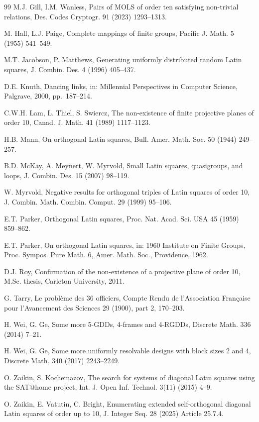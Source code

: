 \documentclass[11pt]{article}
\theoremstyle{remark}
\begin{document}
\begin{thebibliography}{99}
 M.J. Gill, I.M. Wanless, Pairs of MOLS of order ten satisfying non-trivial
relations, Des. Codes Cryptogr. 91 (2023) 1293--1313.

 M. Hall, L.J. Paige, Complete mappings of finite groups, Pacific J. Math. 5
(1955) 541--549.

 M.T. Jacobson, P. Matthews, Generating uniformly distributed random Latin
squares, J. Combin. Des. 4 (1996) 405--437.

 D.E. Knuth, Dancing links, in: Millennial Perspectives in Computer Science,
Palgrave, 2000, pp.~187--214.

 C.W.H. Lam, L. Thiel, S. Swiercz, The non-existence of finite projective
planes of order 10, Canad. J. Math. 41 (1989) 1117--1123.

 H.B. Mann, On orthogonal Latin squares, Bull. Amer. Math. Soc. 50 (1944)
249--257.

 B.D. McKay, A. Meynert, W. Myrvold, Small Latin squares, quasigroups, and
loops, J. Combin. Des. 15 (2007) 98--119.

 W. Myrvold, Negative results for orthogonal triples of Latin squares of
order 10, J. Combin. Math. Combin. Comput. 29 (1999) 95--106.

 E.T. Parker, Orthogonal Latin squares, Proc. Nat. Acad. Sci. USA 45 (1959)
859--862.

 E.T. Parker, On orthogonal Latin squares, in: 1960 Institute on Finite
Groups, Proc. Sympos. Pure Math. 6, Amer. Math. Soc., Providence, 1962.

 D.J. Roy, Confirmation of the non-existence of a projective plane of order
10, M.Sc. thesis, Carleton University, 2011.

 G. Tarry, Le probl\`eme des 36 officiers, Compte Rendu de l'Association
Fran\c{c}aise pour l'Avancement des Sciences 29 (1900), part 2, 170--203.

 H. Wei, G. Ge, Some more 5-GDDs, 4-frames and 4-RGDDs, Discrete Math. 336
(2014) 7--21.

 H. Wei, G. Ge, Some more uniformly resolvable designs with block sizes 2 and
4, Discrete Math. 340 (2017) 2243--2249.

 O. Zaikin, S. Kochemazov, The search for systems of diagonal Latin squares
using the SAT@home project, Int. J. Open Inf. Technol. 3(11) (2015) 4--9.

 O. Zaikin, E. Vatutin, C. Bright, Enumerating extended self-orthogonal
diagonal Latin squares of order up to 10, J. Integer Seq. 28 (2025) Article 25.7.4.

\end{thebibliography}
\end{document}
